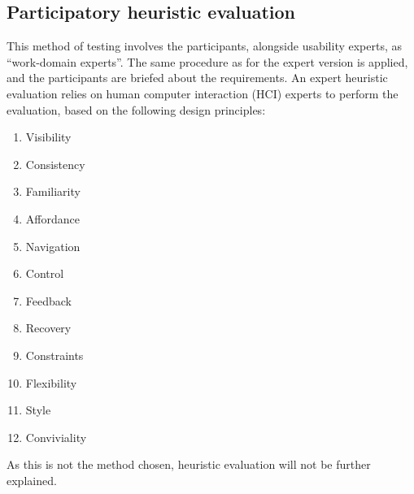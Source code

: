 \subsection{Participatory heuristic evaluation}
This method of testing involves the participants, alongside usability experts, as ``work-domain experts''. The same procedure as for the expert version is applied, and the participants are briefed about the requirements. An expert heuristic evaluation relies on human computer interaction (HCI) experts to perform the evaluation, based on the following design principles:
\begin{enumerate}
	\item Visibility
	\item Consistency
	\item Familiarity
	\item Affordance
	\item Navigation
	\item Control
	\item Feedback
	\item Recovery
	\item Constraints
	\item Flexibility
	\item Style
	\item Conviviality
\end{enumerate}
As this is not the method chosen, heuristic evaluation will not be further explained.